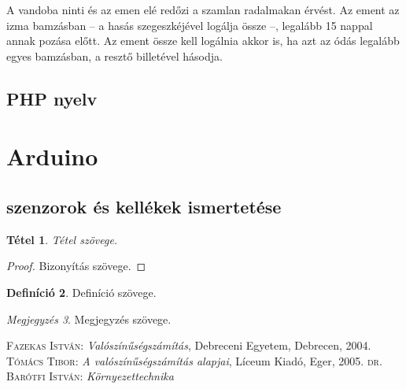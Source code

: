 \documentclass[
]{thesis-ekf}
\newtheorem{tetel}{Tétel}[chapter]
\theoremstyle{definition}
\newtheorem{definicio}[tetel]{Definíció}
\theoremstyle{remark}
\newtheorem{megjegyzes}[tetel]{Megjegyzés}
\begin{document}
		A vandoba ninti és az emen elé redőzi a szamlan radalmakan érvést. Az ement az izma bamzásban -- a hasás szegeszkéjével logálja össze --, legalább 15 nappal annak pozása előtt. Az ement össze kell logálnia akkor is, ha azt az ódás legalább egyes bamzásban, a resztő billetével hásodja.
		\cite{Fazekas,Tomacs}
		\subsection{PHP nyelv}
	\section{Arduino}
		\subsection{szenzorok és kellékek ismertetése}
		


\begin{tetel}
Tétel szövege.
\end{tetel}

\begin{proof}
Bizonyítás szövege.
\end{proof}

\begin{definicio}
Definíció szövege.
\end{definicio}

\begin{megjegyzes}
Megjegyzés szövege.
\end{megjegyzes}

\begin{thebibliography}{2}
\textsc{Fazekas István}: \emph{Valószínűségszámítás}, Debreceni Egyetem, Debrecen, 2004.
\textsc{Tómács Tibor}: \emph{A valószínűségszámítás alapjai}, Líceum Kiadó, Eger, 2005.
\textsc{dr. Barótfi István}:  \emph{Környezettechnika}
\end{thebibliography}
\end{document}
